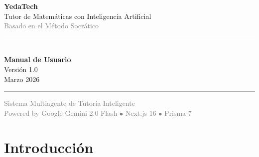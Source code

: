 \documentclass[12pt, a4paper, oneside]{book}
\begin{document}
\begin{titlepage}
    \begin{center}
        \vspace*{2cm}


        \vspace{1.5cm}

        {\Huge\bfseries\textcolor{yt-orange}{YedaTech}}\\[0.5cm]
        {\LARGE\textcolor{yt-dark}{Tutor de Matemáticas con Inteligencia Artificial}}\\[0.3cm]
        {\large\textcolor{gray}{Basado en el Método Socrático}}

        \vspace{2cm}

        \rule{0.6\textwidth}{1pt}\\[0.5cm]
        {\Large\bfseries\textcolor{yt-dark}{Manual de Usuario}}\\[0.3cm]
        {\large Versión 1.0}\\[0.3cm]
        {\large Marzo 2026}\\[0.5cm]
        \rule{0.6\textwidth}{1pt}

        \vfill

        {\large\textcolor{gray}{Sistema Multiagente de Tutoría Inteligente}}\\[0.3cm]
        {\normalsize\textcolor{gray}{Powered by Google Gemini 2.0 Flash $\bullet$ Next.js 16 $\bullet$ Prisma 7}}

        \vspace{1cm}
    \end{center}
\end{titlepage}

\tableofcontents
\clearpage

\chapter{Introducción}
\end{document}
